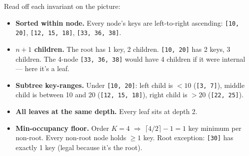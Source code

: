 \documentclass[11pt]{article}
\begin{document}
\begin{center}
\end{center}

Read off each invariant on the picture:
\begin{itemize}[leftmargin=*]
    \item \textbf{Sorted within node.} Every node's keys are
          left-to-right ascending: \texttt{[10, 20]},
          \texttt{[12, 15, 18]}, \texttt{[33, 36, 38]}.
    \item \textbf{$n+1$ children.} The root has 1 key, 2 children.
          \texttt{[10, 20]} has 2 keys, 3 children. The 4-node
          \texttt{[33, 36, 38]} would have 4 children if it were
          internal --- here it's a leaf.
    \item \textbf{Subtree key-ranges.} Under \texttt{[10, 20]}:
          left child is $< 10$ (\texttt{[3, 7]}), middle child is
          between 10 and 20 (\texttt{[12, 15, 18]}), right child is
          $> 20$ (\texttt{[22, 25]}).
    \item \textbf{All leaves at the same depth.} Every leaf sits at
          depth 2.
    \item \textbf{Min-occupancy floor.} Order $K = 4$
          $\Rightarrow$ $\lceil 4/2 \rceil - 1 = 1$ key minimum per
          non-root. Every non-root node holds $\ge 1$ key. Root
          exception: \texttt{[30]} has exactly 1 key (legal because
          it's the root).
\end{itemize}
\end{document}

